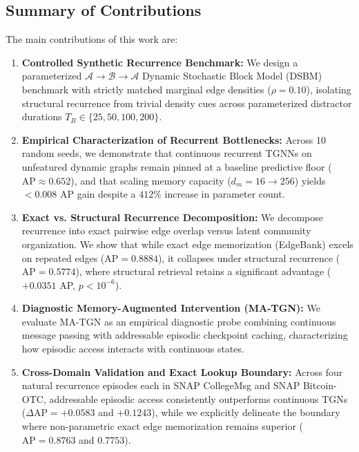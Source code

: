 \documentclass[10pt,twocolumn,letterpaper]{article}
\begin{document}
\subsection{Summary of Contributions}
The main contributions of this work are:
\begin{enumerate}
    \item \textbf{Controlled Synthetic Recurrence Benchmark:} We design a parameterized $\mathcal{A} \to \mathcal{B} \to \mathcal{A}$ Dynamic Stochastic Block Model (DSBM) benchmark with strictly matched marginal edge densities ($\rho = 0.10$), isolating structural recurrence from trivial density cues across parameterized distractor durations $T_B \in \{25, 50, 100, 200\}$.
    \item \textbf{Empirical Characterization of Recurrent Bottlenecks:} Across 10 random seeds, we demonstrate that continuous recurrent TGNNs on unfeatured dynamic graphs remain pinned at a baseline predictive floor ($\text{AP} \approx 0.652$), and that scaling memory capacity ($d_m = 16 \to 256$) yields $<0.008$ AP gain despite a $412\%$ increase in parameter count.
    \item \textbf{Exact vs. Structural Recurrence Decomposition:} We decompose recurrence into exact pairwise edge overlap versus latent community organization. We show that while exact edge memorization (EdgeBank) excels on repeated edges ($\text{AP} = 0.8884$), it collapses under structural recurrence ($\text{AP} = 0.5774$), where structural retrieval retains a significant advantage ($+0.0351$ AP, $p < 10^{-6}$).
    \item \textbf{Diagnostic Memory-Augmented Intervention (MA-TGN):} We evaluate MA-TGN as an empirical diagnostic probe combining continuous message passing with addressable episodic checkpoint caching, characterizing how episodic access interacts with continuous states.
    \item \textbf{Cross-Domain Validation and Exact Lookup Boundary:} Across four natural recurrence episodes each in SNAP CollegeMsg and SNAP Bitcoin-OTC, addressable episodic access consistently outperforms continuous TGNs ($\Delta\text{AP} = +0.0583$ and $+0.1243$), while we explicitly delineate the boundary where non-parametric exact edge memorization remains superior ($\text{AP} = 0.8763$ and $0.7753$).
\end{enumerate}
\end{document}
